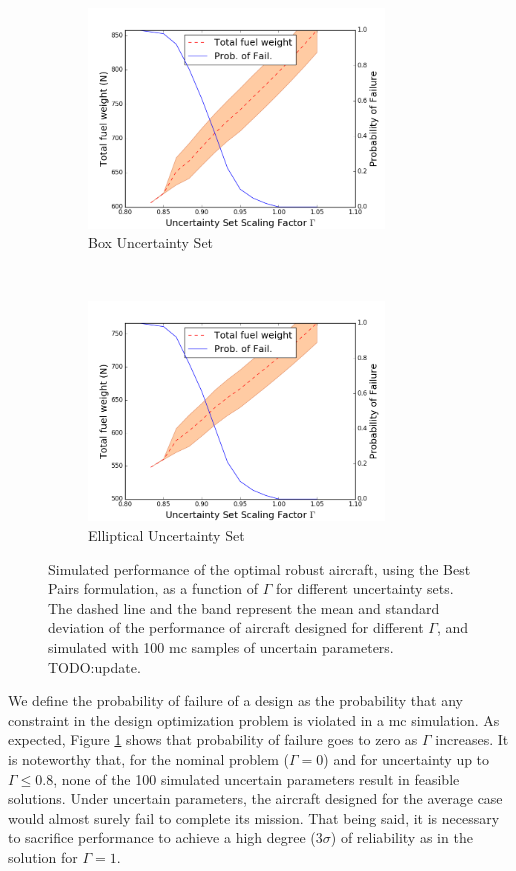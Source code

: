 \begin{figure}[ht]
    \centering
    \captionsetup{justification=centering, font=small}
    \begin{subfigure}{0.49\textwidth}
        \centering
        \includegraphics[height=2.3in]{signomial_simple_flight/box_best_pairs.png}
         \caption{Box Uncertainty Set}
    \end{subfigure}%
    ~ 
    \begin{subfigure}{0.49\textwidth}
        \centering
        \includegraphics[height=2.3in]{signomial_simple_flight/ell_best_pairs.png}
         \caption{Elliptical Uncertainty Set}
    \end{subfigure}
    \caption{Simulated performance of the optimal robust aircraft, using the Best Pairs formulation,
    as a function of $\Gamma$ for different uncertainty sets.
    The dashed line and the band represent the mean and standard deviation of the performance
    of aircraft designed for different $\Gamma$,
    and simulated with 100 \gls{mc} samples of uncertain parameters. TODO:update.}
    \label{fig:probOfFailure}
\end{figure}

We define the probability of failure of a design as the probability that any constraint
in the design optimization problem is violated in a \gls{mc} simulation.
As expected, Figure \ref{fig:probOfFailure} shows that probability of failure goes to zero as $\Gamma$ increases.
It is noteworthy that, for the nominal problem ($\Gamma = 0$) and for uncertainty up to $\Gamma \leq 0.8$, none of
the 100 simulated uncertain parameters result in feasible solutions. Under uncertain parameters,
the aircraft designed for the average case would almost surely fail to complete its mission.
That being said, it is necessary to sacrifice performance to achieve a high degree ($3\sigma$) of
reliability as in the solution for $\Gamma = 1$.

